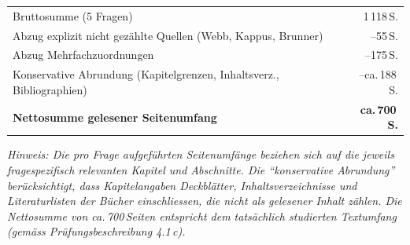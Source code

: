 \documentclass[ngerman, a4paper]{article}
\begin{document}
\vspace{0.8em}
\begin{tabularx}{\textwidth}{Xr}
\toprule
Bruttosumme (5 Fragen) & 1\,118\,S. \\
Abzug explizit nicht gezählte Quellen (Webb, Kappus, Brunner) & --55\,S. \\
Abzug Mehrfachzuordnungen & --175\,S. \\
Konservative Abrundung (Kapitelgrenzen, Inhaltsverz., Bibliographien) & --ca.\,188\,S. \\
\midrule
\textbf{Nettosumme gelesener Seitenumfang} & \textbf{ca.\,700\,S.} \\
\bottomrule
\end{tabularx}

\vspace{0.8em}
\textit{Hinweis: Die pro Frage aufgeführten Seitenumfänge beziehen sich auf die jeweils
fragespezifisch relevanten Kapitel und Abschnitte. Die \enquote{konservative Abrundung}
berücksichtigt, dass Kapitelangaben Deckblätter, Inhaltsverzeichnisse und Literaturlisten
der Bücher einschliessen, die nicht als gelesener Inhalt zählen. Die Nettosumme von
ca.\,700\,Seiten entspricht dem tatsächlich studierten Textumfang
(gemäss Prüfungsbeschreibung 4.1\,c).}
 
\newpage
 
\printbibliography[title={Literaturverzeichnis}]
 
\end{document}
